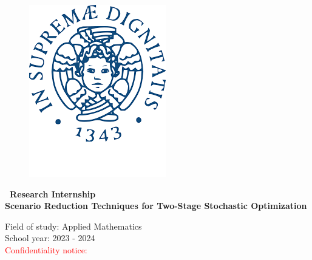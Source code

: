 \documentclass{amsart}
\begin{document}
\begin{figure}[htbp]
\begin{minipage}[b]{0.25\textwidth}
        \includegraphics[width=\textwidth]{logo/universita di pisa.png}
    \end{minipage}
\end{figure}

\vspace{1.5cm}	

\begin{center}	
    {\huge \bf\ Research Internship  \\
    \vspace{0.8cm}
    \huge Scenario Reduction Techniques for Two-Stage Stochastic Optimization \\
    \vspace{1.25cm}

    \normalsize Field of study: Applied Mathematics \\
    School year: 2023 - 2024 \\



    \vspace{3.5cm}
    \textcolor{red}{Confidentiality notice:}\\
    \color{black}
    \vspace{0.5cm}
    }
\end{center}
\end{document}
